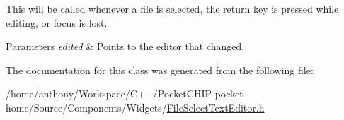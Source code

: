 This will be called whenever a file is selected, the return key is pressed while editing, or focus is lost.


\begin{DoxyParams}{Parameters}
{\em edited} & Points to the editor that changed. \\
\hline
\end{DoxyParams}


The documentation for this class was generated from the following file\+:\begin{DoxyCompactItemize}
\item 
/home/anthony/\+Workspace/\+C++/\+Pocket\+C\+H\+I\+P-\/pocket-\/home/\+Source/\+Components/\+Widgets/\mbox{\hyperlink{FileSelectTextEditor_8h}{File\+Select\+Text\+Editor.\+h}}\end{DoxyCompactItemize}
